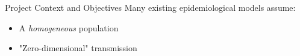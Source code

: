 \begin{slide}{Project Context and Objectives}
	Many existing epidemiological models assume:
	\begin{itemize}
		\item A \emph{homogeneous} population
		\item "Zero-dimensional" transmission
	\end{itemize}
\end{slide}